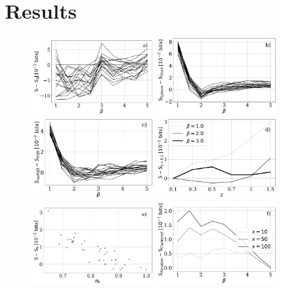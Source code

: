\documentclass[fleqn,usenatbib]{mnras}
\begin{document}
\section{Results}
\label{sec:results}

\begin{figure}
    \centering
    \includegraphics[width=0.41\textwidth]{cosmic_variance.pdf} 
    \includegraphics[width=0.41\textwidth]{geometry.pdf} 
    \includegraphics[width=0.41\textwidth]{rsd.pdf} 
    \includegraphics[width=0.41\textwidth]{redshift.pdf} 
    \includegraphics[width=0.41\textwidth]{param.pdf}
    \includegraphics[width=0.41\textwidth]{random_clustered_n1.pdf}

\end{figure}
\end{document}
